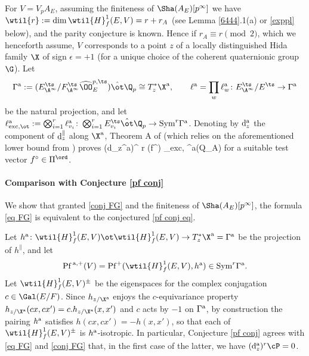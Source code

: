 For  $V=V_{p}A_{E}$, assuming the finiteness of $\Sha(A_{E})[p^{\infty}]$ we have $\wtil{r}:=\dim  \wtil{H}^{1}_{f}(E, V)  =r+r_{A}$ (see Lemma \ref{6444}.1(a) or \eqref{exppl} below), and   the parity conjecture is known. Hence if $r_{A}\equiv r\pmod 2$,  which we henceforth assume,
  $V$ corresponds to a point $z$ of a locally  distinguished Hida family $\X$ of sign $\epsilon =+1$ (for a unique choice of the coherent quaternionic group $\G$).
 Let
 $$\Gamma^{\rm a}:= (E_{\A^{\infty}}^{\ts}/F_{\A^{\infty}}^{\ts}\widehat{\OO}_{E}^{p, \ts}) \hat{\ot}\Q_{p}\cong T_{z}^{*}\X^{\rm a},
 \qquad  \ell^{\rm a}=\prod_{w} \ell^{\rm a}_{w}\colon E_{\A^{\infty}}^{\ts}/E^{\ts} \to \Gamma^{\rm a}$$
  be the natural projection, and let
  $\ell_{\rm exc, \ot}^{\rm a}:=\bigotimes_{i=1}^{r}\ell^{\rm a}_{v_{i}}\colon \bigotimes_{i=1}^{r} E_{v_{i}}^{\ts}\hat{\ot}\Q_{p} \to {\rm Sym}^{r}\Gamma^{\rm a}$.  Denoting by ${\rm d}_{z}^{\rm a}$ the component of ${\rm d}_{z}^{\parallel}$ along $\X^{\rm a}$,
Theorem A of \cite{FG}  (which relies on the aforementioned lower bound from \cite{BGe}) proves
\beq {} ({\rm d}_{z}^{\rm a})^{ r} \cP(f^{\circ}) \doteq \ell_{\rm exc, \ot}^{\rm a}(Q_{A}) \eeq
for a suitable test vector $f^{\circ}\in \Pi^{\ord}$.

 \paragraph{Comparison with Conjecture \ref{pf conj}}
We show that granted \eqref{conj FG} and the finiteness of $\Sha(A_{E})[p^{\infty}]$, the formula \eqref{eq FG} is equivalent to the conjectured \eqref{pf conj eq}.







Let $h^{\rm a}\colon \wtil{H}^{1}_{f}(E, V) \ot \wtil{H}^{1}_{f}(E, V) \to T_{z}^{*}\X^{\rm a}=\Gamma^{\rm a}$
be the projection of $h^{\parallel}$, and let
$${\rm Pf}^{\, \rm a, +}(V) ={\rm Pf}^{+} ( \wtil{H}^{1}_{f}(E, V) , h^{\rm a}) \in {\rm Sym}^{r} \Gamma^{\rm a}.$$
Let $\wtil{H}^{1}_{f}(E, V)^{\pm}$ be the eigenspaces for the complex conjugation $c\in \Gal(E/F)$.   Since $h_{z/\X^{\rm a}}$ enjoys the $c$-equivariance property $h_{z/\X^{\rm a}}(cx, cx')=c. h_{z/\X^{\rm a}}(x, x')$ and $c$ acts by $-1$ on $\Gamma^{\rm a}$, by construction the pairing $h^{\rm a}$ satisfies $h(cx, cx')= -h(x, x')$,  so that each of  $\wtil{H}^{1}_{f}(E, V)^{\pm}$ is $h^{\rm a}$-isotropic. In particular, Conjecture \ref{pf conj} agrees with \eqref{eq FG} and \eqref{conj FG} that, in the first case of the latter, we have $({\rm d}_{z}^{\rm a})^{r}\cP=0$.


